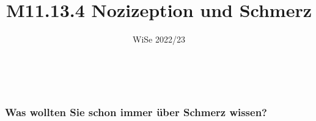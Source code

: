 \documentclass{beamer}
\title[M11.13.4 Nozizeption und Schmerz]{M11.13.4 Nozizeption und Schmerz}
\author[melanie.stefan@medicalschool-berlin.de]{}
\institute[]{Prof. Melanie Stefan \\ melanie.stefan@medcialschool-berlin.de}
\date{WiSe 2022/23}
\begin{document}
{  
\begin{frame}

 \maketitle 

$\,$\\[6cm] 


\end{frame} 
}


{  
\begin{frame}
\frametitle{Was wollten Sie schon immer über Schmerz wissen?}

\end{frame} 
}
\end{document}
